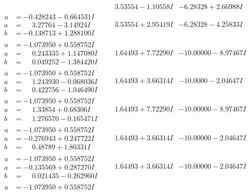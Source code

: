 \documentclass[1p]{elsarticle_modified}
\theoremstyle{definition}
\begin{document}
$$\begin{array}{c|c|c}
 & \phantom{-}3.53554 - 1.10558 I & -6.28328 + 2.66988 I \\ \hline\begin{aligned}
u &= -0.428243 - 0.664531 I \\
a &= \phantom{-}3.27764 - 3.14924 I \\
b &= -0.138713 + 1.288100 I\end{aligned}
 & \phantom{-}3.53554 + 2.95419 I & -6.28328 - 4.25833 I \\ \hline\begin{aligned}
u &= -1.073950 + 0.558752 I \\
a &= \phantom{-}0.243335 + 1.147080 I \\
b &= \phantom{-}0.049252 - 1.384420 I\end{aligned}
 & \phantom{-}1.64493 + 7.72290 I & -10.00000 - 8.97467 I \\ \hline\begin{aligned}
u &= -1.073950 + 0.558752 I \\
a &= \phantom{-}1.243930 - 0.068036 I \\
b &= \phantom{-}0.422756 - 1.046490 I\end{aligned}
 & \phantom{-}1.64493 + 3.66314 I & -10.0000 - 2.04647 I \\ \hline\begin{aligned}
u &= -1.073950 + 0.558752 I \\
a &= \phantom{-}1.33854 + 0.68306 I \\
b &= \phantom{-}1.276570 - 0.165471 I\end{aligned}
 & \phantom{-}1.64493 + 7.72290 I & -10.00000 - 8.97467 I \\ \hline\begin{aligned}
u &= -1.073950 + 0.558752 I \\
a &= -0.276943 + 0.247722 I \\
b &= \phantom{-}0.48789 + 1.80331 I\end{aligned}
 & \phantom{-}1.64493 + 3.66314 I & -10.00000 - 2.04647 I \\ \hline\begin{aligned}
u &= -1.073950 + 0.558752 I \\
a &= -0.135569 + 0.287270 I \\
b &= \phantom{-}0.021435 - 0.262960 I\end{aligned}
 & \phantom{-}1.64493 + 3.66314 I & -10.00000 - 2.04647 I \\ \hline\begin{aligned}
u &= -1.073950 + 0.558752 I \\

\end{aligned}
\end{array}$$
\end{document}

